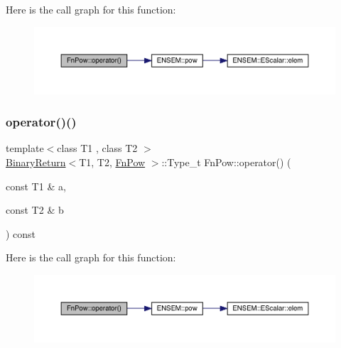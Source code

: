 Here is the call graph for this function\+:
\nopagebreak
\begin{figure}[H]
\begin{center}
\leavevmode
\includegraphics[width=350pt]{db/dec/structFnPow_ae45f2e7b97a332060329770959c524c7_cgraph}
\end{center}
\end{figure}
\mbox{\label{structFnPow_ae45f2e7b97a332060329770959c524c7}} 
\subsubsection{\texorpdfstring{operator()()}{operator()()}\hspace{0.1cm}{\footnotesize\ttfamily [2/3]}}
{\footnotesize\ttfamily template$<$class T1 , class T2 $>$ \\
\mbox{\hyperlink{structBinaryReturn}{Binary\+Return}}$<$T1, T2, \mbox{\hyperlink{structFnPow}{Fn\+Pow}} $>$\+::Type\+\_\+t Fn\+Pow\+::operator() (\begin{DoxyParamCaption}\item[{const T1 \&}]{a,  }\item[{const T2 \&}]{b }\end{DoxyParamCaption}) const\hspace{0.3cm}{\ttfamily [inline]}}

Here is the call graph for this function\+:
\nopagebreak
\begin{figure}[H]
\begin{center}
\leavevmode
\includegraphics[width=350pt]{db/dec/structFnPow_ae45f2e7b97a332060329770959c524c7_cgraph}
\end{center}
\end{figure}
\mbox{\label{structFnPow_ae45f2e7b97a332060329770959c524c7}} 
